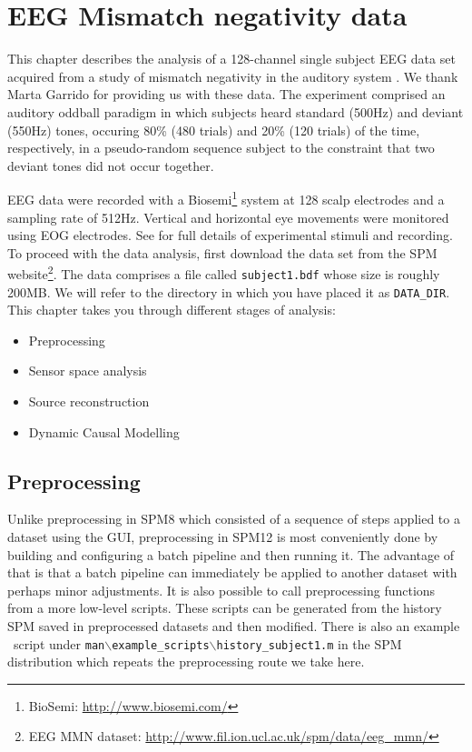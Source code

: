 \chapter{EEG Mismatch negativity data\label{Chap:data:mmn}}

This chapter describes the analysis of a 128-channel single subject EEG data set acquired from a study of mismatch negativity in the auditory system \cite{marta_mmndcm}. We thank Marta Garrido for providing us with these data. The experiment comprised an auditory oddball paradigm in which subjects heard standard (500Hz) and deviant (550Hz) tones, occuring 80\% (480 trials) and 20\% (120 trials) of the time, respectively, in a pseudo-random sequence subject to the constraint that two deviant tones did not occur together.

EEG data were recorded with a Biosemi\footnote{BioSemi: \url{http://www.biosemi.com/}} system at 128 scalp electrodes and a sampling rate of 512Hz. Vertical and horizontal eye movements were monitored using EOG electrodes. See \cite{marta_mmndcm} for full details of experimental stimuli and recording. To proceed with the data analysis, first download the  data set from the SPM website\footnote{EEG MMN dataset: \url{http://www.fil.ion.ucl.ac.uk/spm/data/eeg\_mmn/}}. The data comprises a file called \texttt{subject1.bdf} whose size is roughly 200MB. We will refer to the directory in which you have placed it as \texttt{DATA\_DIR}. This chapter takes you through different stages of analysis:

\begin{itemize}
\item{Preprocessing}
\item{Sensor space analysis}
\item{Source reconstruction}
\item{Dynamic Causal Modelling}
\end{itemize}

\section{Preprocessing}

Unlike preprocessing in SPM8 which consisted of a sequence of steps applied to a dataset using the GUI, preprocessing in SPM12 is most conveniently done by building and configuring a batch pipeline and then running it. The advantage of that is that a batch pipeline can immediately be applied to another dataset with perhaps minor adjustments. It is also possible to call preprocessing functions from a more low-level scripts. These scripts can be generated from the history SPM saved in preprocessed datasets and then modified.  There is also an example \matlab\ script under \texttt{man$\backslash$example\_scripts$\backslash$history\_subject1.m} in the SPM distribution which repeats the preprocessing route we take here.

